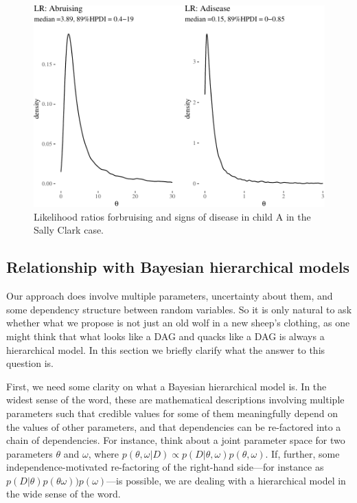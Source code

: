 \documentclass[
  10pt,
  dvipsnames,enabledeprecatedfontcommands]{scrartcl}
\begin{document}
\begin{figure}[H]


\begin{center}\includegraphics[width=0.9\linewidth]{imprecision_philosophical_paper._files/figure-latex/SClrs-1} \end{center}

\caption{Likelihood ratios forbruising and signs of disease in child A in the Sally Clark case.}
\label{fig:SClrs}

\end{figure}

\hypertarget{relationship-with-bayesian-hierarchical-models}{%
\subsection{Relationship with Bayesian hierarchical
models}\label{relationship-with-bayesian-hierarchical-models}}

Our approach does involve multiple parameters, uncertainty about them,
and some dependency structure between random variables. So it is only
natural to ask whether what we propose is not just an old wolf in a new
sheep's clothing, as one might think that what looks like a DAG and
quacks like a DAG is always a hierarchical model. In this section we
briefly clarify what the answer to this question is.

First, we need some clarity on what a Bayesian hierarchical model is. In
the widest sense of the word, these are mathematical descriptions
involving multiple parameters such that credible values for some of them
meaningfully depend on the values of other parameters, and that
dependencies can be re-factored into a chain of dependencies. For
instance, think about a joint parameter space for two parameters
\(\theta\) and \(\omega\), where
\(p(\theta, \omega \vert D) \propto p(D \vert \theta, \omega)p(\theta, \omega)\).
If, further, some independence-motivated re-factoring of the right-hand
side---for instance as
\(p(D\vert \theta)p(\theta \omega)) p (\omega)\)---is possible, we are
dealing with a hierarchical model in the wide sense of the word.
\end{document}
